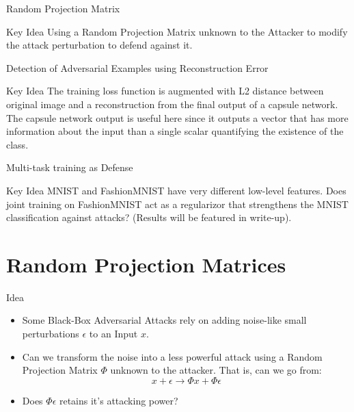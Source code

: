 \documentclass{beamer}
\begin{document}
	\begin{frame}{Random Projection Matrix}
		\begin{block}{Key Idea}
			Using a Random Projection Matrix unknown to the Attacker to modify the attack perturbation to defend against it.
		\end{block}
	\end{frame}
	
	
	\begin{frame}{Detection of Adversarial Examples using Reconstruction Error}
		\begin{block}{Key Idea}
			The training loss function is augmented with L2 distance between original image and a reconstruction from the final output of a capsule network. The capsule network output is useful here since it outputs a vector that has more information about the input than a single scalar quantifying the existence of the class.
		\end{block}
	\end{frame}
	
	\begin{frame}{Multi-task training as Defense}
		\begin{block}{Key Idea}
			MNIST and FashionMNIST have very different low-level features. Does joint training on FashionMNIST act as a regularizor that strengthens the MNIST classification against attacks? (Results will be featured in write-up).
		\end{block}
	\end{frame}
	
	\section*{Random Projection Matrices}
	
	\begin{frame}{Idea}
		\begin{block}{}
			\begin{itemize}
				\item Some Black-Box Adversarial Attacks rely on adding noise-like small perturbations $ \epsilon $  to an Input $ x $.
				\item Can we transform the noise into a less powerful attack using a Random Projection Matrix $ \Phi $ unknown to the attacker. That is, can we go from:
				$$ x + \epsilon \to \Phi x + \Phi \epsilon $$
				\item Does $ \Phi \epsilon $ retains it's attacking power?
			\end{itemize}
		\end{block}
	\end{frame}
	
\end{document}
